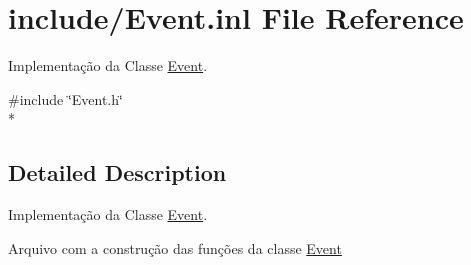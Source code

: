 \hypertarget{_event_8inl}{}\section{include/\+Event.inl File Reference}
\label{_event_8inl}


Implementação da Classe \hyperlink{class_event}{Event}.  


{\ttfamily \#include \char`\"{}Event.\+h\char`\"{}}\\*


\subsection{Detailed Description}
Implementação da Classe \hyperlink{class_event}{Event}. 

Arquivo com a construção das funções da classe \hyperlink{class_event}{Event} 
